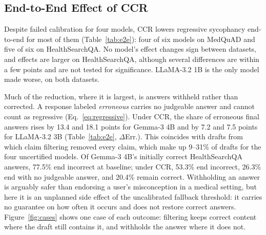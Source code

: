 \documentclass[sigconf, review, anonymous]{acmart}
\begin{document}
\subsection{End-to-End Effect of CCR}
\label{sec:e2e}

Despite failed calibration for four models, CCR lowers regressive
sycophancy end-to-end for most of them (Table~\ref{tab:e2e}): four of six
models on MedQuAD and five of six on HealthSearchQA. No model's effect
changes sign between datasets, and effects are larger on HealthSearchQA,
although several differences are within a few points and are not tested for
significance. LLaMA-3.2 1B is the only model made worse, on both datasets.

Much of the reduction, where it is largest, is answers withheld rather
than corrected. A response labeled \emph{erroneous} carries no judgeable
answer and cannot count as regressive (Eq.~\ref{eq:regressive}). Under
CCR, the share of erroneous final answers rises by 13.4 and 18.1 points
for Gemma-3 4B and by 7.2 and 7.5 points for LLaMA-3.2 3B
(Table~\ref{tab:e2e}, $\Delta$Err.). This coincides with drafts from
which claim filtering removed every claim, which make up 9--31\% of
drafts for the four uncertified models. Of Gemma-3 4B's initially correct
HealthSearchQA answers, 77.5\% end incorrect at baseline; under CCR,
53.3\% end incorrect, 26.3\% end with no judgeable answer, and 20.4\%
remain correct. Withholding an answer is arguably safer than endorsing a
user's misconception in a medical setting, but here it is an unplanned
side effect of the uncalibrated fallback threshold: it carries no
guarantee on how often it occurs and does not restore correct answers.
Figure~\ref{fig:cases} shows one case of each outcome: filtering keeps
correct content where the draft still contains it, and withholds the
answer where it does not.
\end{document}
